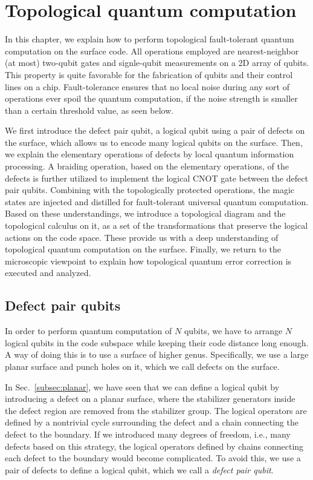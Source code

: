 \chapter{Topological quantum computation}
\label{Chap:TQC}
In this chapter, we explain how to perform topological fault-tolerant quantum computation on the surface code.
All operations employed are nearest-neighbor (at most) two-qubit gates and signle-qubit measurements on a 2D array of qubits.
This property is quite favorable for the fabrication of qubits and their control lines on a chip.
Fault-tolerance ensures that no local noise during any sort of operations ever spoil the quantum computation, if the noise strength is smaller than a certain threshold value, as seen below.

We first introduce the defect pair qubit, a logical qubit using a pair of defects on the surface, which allows us to encode many logical qubits on the surface.
Then, we explain the elementary operations of defects by local quantum information processing.
A braiding operation, based on the elementary operations, of the defects is further utilized to implement the logical CNOT gate between the defect pair qubits.
Combining with the topologically protected operations, the magic states are injected 
and distilled for fault-tolerant universal quantum computation.
Based on these understandings, we introduce a topological diagram and the topological calculus on it, as a set of the transformations that preserve the logical actions on the code space.
These provide us with a deep understanding of topological quantum computation on the surface. 
Finally, we return to the microscopic viewpoint to explain how topological quantum error correction is executed and analyzed.


\section{Defect pair qubits}
\label{Sec:DPQ}
In order to perform quantum computation of $N$ qubits, we have to arrange $N$ logical qubits in the code subspace while keeping their code distance long enough.
A way of doing this is to use a surface of higher genus. 
Specifically, we use a large planar surface and punch holes on it, which we call defects on the surface.

In Sec.~\ref{subsec:planar}, we have seen that we can define a logical qubit by introducing a defect on a planar surface, where the stabilizer generators inside the defect region 
are removed from the stabilizer group.
The logical operators are defined by a nontrivial cycle surrounding the defect and a chain connecting the defect to the boundary.
If we introduced many degrees of freedom, i.e., many defects
based on this strategy, the logical operators defined by chains connecting each defect to the boundary would become complicated.
To avoid this, we use a pair of defects to define a logical qubit, which we call a {\it defect pair qubit}.


